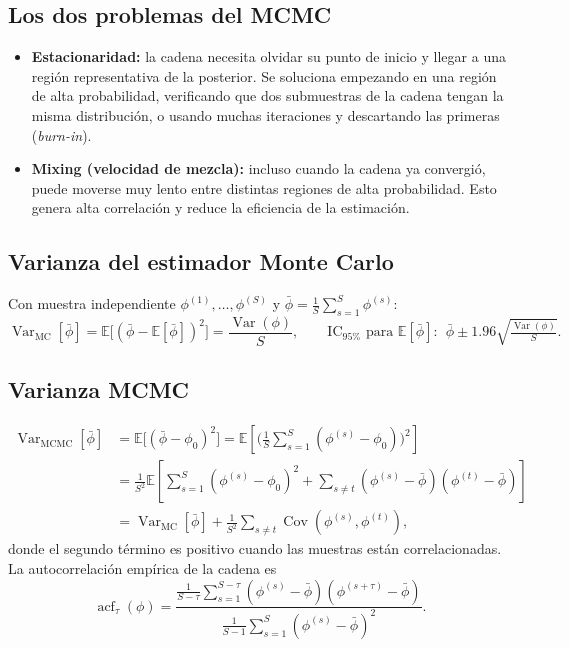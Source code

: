\documentclass[11pt]{article}
\newcommand{\E}{\mathbb{E}}
\newcommand{\Var}{\operatorname{Var}}
\newcommand{\Cov}{\operatorname{Cov}}
\theoremstyle{definition}
\begin{document}
\subsection{Los dos problemas del MCMC}
\begin{itemize}[leftmargin=2em]
  \item \textbf{Estacionaridad:} la cadena necesita olvidar su punto de inicio y llegar a una región representativa de la posterior. Se soluciona empezando en una región de alta probabilidad, verificando que dos submuestras de la cadena tengan la misma distribución, o usando muchas iteraciones y descartando las primeras (\emph{burn-in}).
  \item \textbf{Mixing (velocidad de mezcla):} incluso cuando la cadena ya convergió, puede moverse muy lento entre distintas regiones de alta probabilidad. Esto genera alta correlación y reduce la eficiencia de la estimación.
\end{itemize}

\subsection{Varianza del estimador Monte Carlo}
Con muestra independiente $\phi^{(1)},\dots,\phi^{(S)}$ y $\bar\phi=\tfrac{1}{S}\sum_{s=1}^S\phi^{(s)}$:
\[
\Var_{\text{MC}}[\bar\phi]=\E\big[(\bar\phi-\E[\bar\phi])^2\big]=\frac{\Var(\phi)}{S},
\qquad
\text{IC}_{95\%}\text{ para }\E[\bar\phi]:\ \ \bar\phi\pm 1.96\sqrt{\tfrac{\Var(\phi)}{S}}.
\]

\subsection{Varianza MCMC}
\begin{align*}
\Var_{\text{MCMC}}[\bar\phi]&=\E\big[(\bar\phi-\phi_0)^2\big]=\E\!\left[\Big(\tfrac{1}{S}\sum_{s=1}^S(\phi^{(s)}-\phi_0)\Big)^2\right]\\
&=\frac{1}{S^2}\E\!\left[\sum_{s=1}^S(\phi^{(s)}-\phi_0)^2+\sum_{s\ne t}(\phi^{(s)}-\bar\phi)(\phi^{(t)}-\bar\phi)\right]\\
&=\Var_{\text{MC}}[\bar\phi]+\frac{1}{S^2}\sum_{s\ne t}\Cov(\phi^{(s)},\phi^{(t)}),
\end{align*}
donde el segundo término es positivo cuando las muestras están correlacionadas. La autocorrelación empírica de la cadena es
\[
\operatorname{acf}_\tau(\phi)=\frac{\tfrac{1}{S-\tau}\sum_{s=1}^{S-\tau}(\phi^{(s)}-\bar\phi)(\phi^{(s+\tau)}-\bar\phi)}{\tfrac{1}{S-1}\sum_{s=1}^S(\phi^{(s)}-\bar\phi)^2}.
\]
\end{document}
